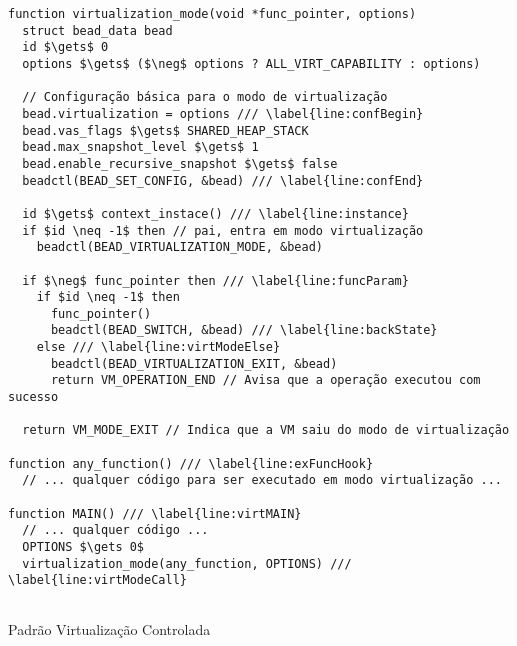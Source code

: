 \begin{pseudocode}
\begin{lstlisting}[language=pseudocode, style=pseudocode]
function virtualization_mode(void *func_pointer, options)
  struct bead_data bead
  id $\gets$ 0
  options $\gets$ ($\neg$ options ? ALL_VIRT_CAPABILITY : options)

  // Configuração básica para o modo de virtualização
  bead.virtualization = options /// \label{line:confBegin}
  bead.vas_flags $\gets$ SHARED_HEAP_STACK
  bead.max_snapshot_level $\gets$ 1
  bead.enable_recursive_snapshot $\gets$ false
  beadctl(BEAD_SET_CONFIG, &bead) /// \label{line:confEnd}

  id $\gets$ context_instace() /// \label{line:instance}
  if $id \neq -1$ then // pai, entra em modo virtualização
    beadctl(BEAD_VIRTUALIZATION_MODE, &bead)

  if $\neg$ func_pointer then /// \label{line:funcParam}
    if $id \neq -1$ then
      func_pointer()
      beadctl(BEAD_SWITCH, &bead) /// \label{line:backState}
    else /// \label{line:virtModeElse}
      beadctl(BEAD_VIRTUALIZATION_EXIT, &bead)
      return VM_OPERATION_END // Avisa que a operação executou com sucesso

  return VM_MODE_EXIT // Indica que a VM saiu do modo de virtualização

function any_function() /// \label{line:exFuncHook}
  // ... qualquer código para ser executado em modo virtualização ...      

function MAIN() /// \label{line:virtMAIN}
  // ... qualquer código ...
  OPTIONS $\gets 0$
  virtualization_mode(any_function, OPTIONS) /// \label{line:virtModeCall}
  
\end{lstlisting}

  \caption{Padrão Virtualização Controlada}
  \label{alg:virtMode}
\end{pseudocode}
